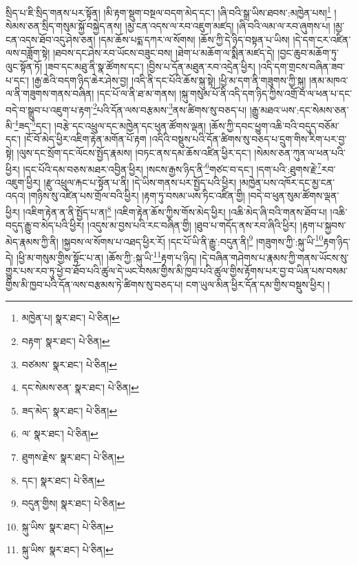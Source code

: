 སྲིད་པ་ཇི་སྲིད་གནས་པར་སྟོན། །མི་རྟག་སྡུག་བསྔལ་བདག་མེད་དང་། །ཞི་བའི་སྒྲ་ཡིས་ཐབས་:མཁྱེན་པས།\footnote{མཁྱེན་པ།  སྣར་ཐང་།  པེ་ཅིན། } །སེམས་ཅན་སྲིད་གསུམ་སྐྱོ་བསྐྱེད་ནས། །མྱ་ངན་འདས་ལ་རབ་འཇུག་མཛད། །ཞི་བའི་ལམ་ལ་རབ་ཞུགས་པ། །མྱ་ངན་འདས་ཐོབ་འདུ་ཤེས་ཅན། །དམ་ཆོས་པདྨ་དཀར་ལ་སོགས། །ཆོས་ཀྱི་དེ་ཉིད་བསྟན་པ་ཡིས། །དེ་དག་ངར་འཛིན་ལས་བཟློག་སྟེ། །ཐབས་དང་ཤེས་རབ་ཡོངས་བཟུང་བས། །ཐེག་པ་མཆོག་ལ་སྨིན་མཛད་དེ། །བྱང་ཆུབ་མཆོག་ཏུ་ལུང་སྟོན་ཏོ། །ཟབ་དང་མཐུ་ནི་སྣ་ཚོགས་དང་། །བྱིས་པ་དོན་མཐུན་རབ་འདྲེན་ཕྱིར། །འདི་དག་གྲངས་བཞིན་ཟབ་པ་དང་། །རྒྱ་ཆེའི་བདག་ཉིད་ཆེར་ཤེས་བྱ། །འདི་ནི་དང་པོའི་ཆོས་སྐུ་སྟེ། །ཕྱི་མ་དག་ནི་གཟུགས་ཀྱི་སྐུ། །ནམ་མཁའ་ལ་ནི་གཟུགས་གནས་བཞིན། །དང་པོ་ལ་ནི་ཐ་མ་གནས། །སྐུ་གསུམ་པོ་ནི་འདི་དག་ཉིད་ཀྱིས་འགྲོ་བ་ལ་ཕན་པ་དང་བདེ་བ་སྒྲུབ་པ་འཇུག་པ་རྟག་\footnote{བརྟག་  སྣར་ཐང་།  པེ་ཅིན། }པའི་དོན་ལས་བརྩམས་\footnote{བཙམས་  སྣར་ཐང་།  པེ་ཅིན། }ནས་ཚིགས་སུ་བཅད་པ། །རྒྱུ་མཐའ་ཡས་:དང་སེམས་ཅན་མི་\footnote{དང་སེམས་ཅན་  སྣར་ཐང་།  པེ་ཅིན། }ཟད་\footnote{ཟད་མེད་  སྣར་ཐང་།  པེ་ཅིན། }དང་། །བརྩེ་དང་འཕྲུལ་དང་མཁྱེན་དང་ཕུན་ཚོགས་ལྡན། །ཆོས་ཀྱི་དབང་ཕྱུག་འཆི་བའི་བདུད་བཅོམ་དང་། །ངོ་བོ་མེད་ཕྱིར་འཇིག་རྟེན་མགོན་པོ་རྟག །འདིའི་བསྡུས་པའི་དོན་ཚིགས་སུ་བཅད་པ་དྲུག་གིས་རིག་པར་བྱ་སྟེ། །ལུས་དང་སྲོག་དང་ལོངས་སྤྱོད་རྣམས། །བཏང་ནས་དམ་ཆོས་འཛིན་ཕྱིར་དང་། །སེམས་ཅན་ཀུན་ལ་ཕན་པའི་ཕྱིར། །དང་པོའི་དམ་བཅས་མཐར་འབྱིན་ཕྱིར། །སངས་རྒྱས་ཉིད་ནི་\footnote{ལ་  སྣར་ཐང་།  པེ་ཅིན། }གཙང་བ་དང་། །དག་པའི་:ཐུགས་རྗེ་\footnote{ཐུགས་རྗེས་  སྣར་ཐང་།  པེ་ཅིན། }རབ་འཇུག་ཕྱིར། །རྫུ་འཕྲུལ་རྐང་པ་སྟོན་པ་ནི། །དེ་ཡིས་གནས་པར་སྤྱོད་པའི་ཕྱིར། །མཁྱེན་པས་འཁོར་དང་མྱ་ངན་འདའ། །གཉིས་སུ་འཛིན་པས་གྲོལ་བའི་ཕྱིར། །རྟག་ཏུ་བསམ་ཡས་ཏིང་འཛིན་གྱི། །བདེ་བ་ཕུན་སུམ་ཚོགས་ལྡན་ཕྱིར། །འཇིག་རྟེན་ན་ནི་སྤྱོད་པ་ན།\footnote{དང་།  སྣར་ཐང་།  པེ་ཅིན། } །འཇིག་རྟེན་ཆོས་ཀྱིས་གོས་མེད་ཕྱིར། །འཆི་མེད་ཞི་བའི་གནས་ཐོབ་པ། །འཆི་བདུད་རྒྱུ་བ་མེད་པའི་ཕྱིར། །འདུས་མ་བྱས་པའི་རང་བཞིན་གྱི། །ཐུབ་པ་གདོད་ནས་རབ་ཞིའི་ཕྱིར། །རྟག་པ་སྐྱབས་མེད་རྣམས་ཀྱི་ནི། །སྐྱབས་ལ་སོགས་པ་འཐད་ཕྱིར་རོ། །དང་པོ་ཡི་ནི་རྒྱུ་:བདུན་ནི།\footnote{བདུན་གྱིས།  སྣར་ཐང་།  པེ་ཅིན། } །གཟུགས་ཀྱི་:སྐུ་ཡི་\footnote{སྐུ་ཡིས་  སྣར་ཐང་།  པེ་ཅིན། }རྟག་ཉིད་དེ། །ཕྱི་མ་གསུམ་གྱིས་སྟོང་པ་ན། །ཆོས་ཀྱི་:སྐུ་ཡི་\footnote{སྐུ་ཡིས་  སྣར་ཐང་།  པེ་ཅིན། }རྟག་པ་ཉིད། །དེ་བཞིན་གཤེགས་པ་རྣམས་ཀྱི་གནས་ཡོངས་སུ་གྱུར་པས་རབ་ཏུ་ཕྱེ་བ་ཐོབ་པའི་ཚུལ་དེ་ཡང་བསམ་གྱིས་མི་ཁྱབ་པའི་ཚུལ་གྱིས་རྟོགས་པར་བྱ་བ་ཡིན་པས་བསམ་གྱིས་མི་ཁྱབ་པའི་དོན་ལས་བརྩམས་ཏེ་ཚིགས་སུ་བཅད་པ། ངག་ཡུལ་མིན་ཕྱིར་དོན་དམ་གྱིས་བསྡུས་ཕྱིར། །
